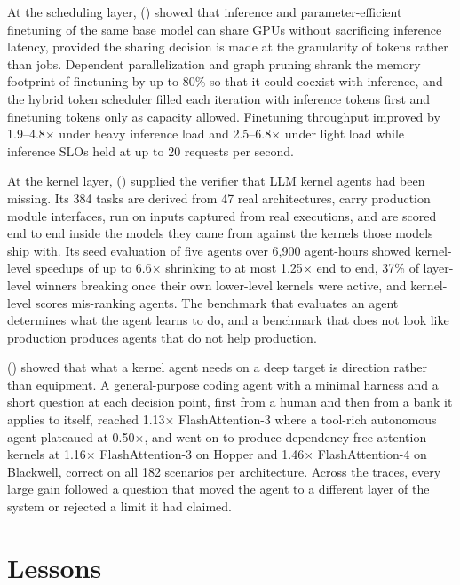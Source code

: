 At the scheduling layer, \FlexLLM () showed that inference and parameter-efficient finetuning of the same base model can share GPUs without sacrificing inference latency, provided the sharing decision is made at the granularity of tokens rather than jobs.
Dependent parallelization and graph pruning shrank the memory footprint of finetuning by up to 80\% so that it could coexist with inference, and the hybrid token scheduler filled each iteration with inference tokens first and finetuning tokens only as capacity allowed.
Finetuning throughput improved by 1.9--4.8$\times$ under heavy inference load and 2.5--6.8$\times$ under light load while inference SLOs held at up to 20 requests per second.

At the kernel layer, \FastKernels () supplied the verifier that LLM kernel agents had been missing.
Its 384 tasks are derived from 47 real architectures, carry production module interfaces, run on inputs captured from real executions, and are scored end to end inside the models they came from against the kernels those models ship with.
Its seed evaluation of five agents over 6{,}900 agent-hours showed kernel-level speedups of up to 6.6$\times$ shrinking to at most 1.25$\times$ end to end, 37\% of layer-level winners breaking once their own lower-level kernels were active, and kernel-level scores mis-ranking agents.
The benchmark that evaluates an agent determines what the agent learns to do, and a benchmark that does not look like production produces agents that do not help production.

\KernelSeek () showed that what a kernel agent needs on a deep target is direction rather than equipment.
A general-purpose coding agent with a minimal harness and a short question at each decision point, first from a human and then from a bank it applies to itself, reached 1.13$\times$ FlashAttention-3 where a tool-rich autonomous agent plateaued at 0.50$\times$, and went on to produce dependency-free attention kernels at 1.16$\times$ FlashAttention-3 on Hopper and 1.46$\times$ FlashAttention-4 on Blackwell, correct on all 182 scenarios per architecture.
Across the traces, every large gain followed a question that moved the agent to a different layer of the system or rejected a limit it had claimed.

\section{Lessons}
\label{conclusion:sec:lessons}

